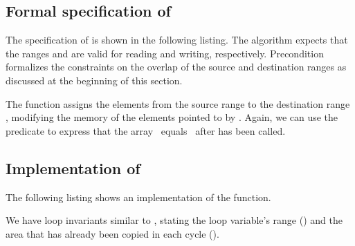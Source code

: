 
\subsection{Formal specification of \copybackward}

The specification of \copybackward is shown in the following listing.
The \copybackward algorithm expects that the ranges  and 
are valid for reading and writing, respectively.
Precondition  formalizes the constraints on the overlap of
the source and destination ranges as discussed at the beginning of this section.



The function \copybackward assigns the elements from the source
range  to the destination range , modifying the memory of the
elements pointed to by .
Again, we can use the  predicate to express that the
array~ equals~ after \copybackward has been called.


\subsection{Implementation of \copybackward}

The following listing shows an implementation of the
\copybackward function.



We have loop invariants similar to \copyi, stating the loop variable's range
()
and the area that has already been copied in each cycle (\equal).

\clearpage

